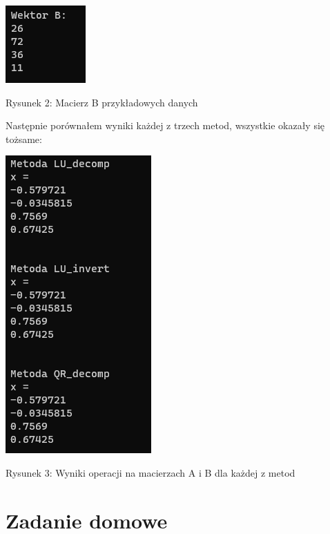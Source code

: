 \documentclass[5]{article}
\begin{document}
\begin{center}
    \vspace{4mm}
    \includegraphics[scale=0.8]{przyklad_B.PNG} \par
\end{center}
\hfil{Rysunek 2: Macierz B przykładowych danych} \par

\vspace{4mm}
Następnie porównałem wyniki każdej z trzech metod, wszystkie okazały się tożsame:

\begin{center}
    \vspace{4mm}
    \includegraphics[scale=0.8]{przyklad_x.PNG} \par
\end{center}
\hfil{Rysunek 3: Wyniki operacji na macierzach A i B dla każdej z metod} \par


\section{Zadanie domowe}
\end{document}
